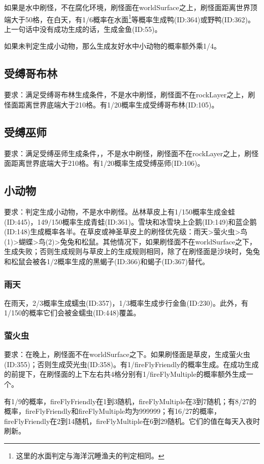 如果是水中刷怪，不在腐化环境，刷怪面在worldSurface之上，刷怪面距离世界顶端大于50格，在白天，有1/6概率在水面\footnote{这里的水面判定与海洋沉睡渔夫的判定相同。}等概率生成鸭(ID:364)或野鸭(ID:362)。上一句话中没有成功生成的话，生成金鱼(ID:55)。

如果未判定生成小动物，那么生成友好水中小动物的概率额外乘1/4。

\subsection{受缚哥布林}
要求：满足受缚哥布林生成条件，不是水中刷怪，刷怪面不在rockLayer之上，刷怪面距离世界底端大于210格。有1/20概率生成受缚哥布林(ID:105)。

\subsection{受缚巫师}
要求：满足受缚巫师生成条件，，不是水中刷怪，刷怪面不在rockLayer之上，刷怪面距离世界底端大于210格。有1/20概率生成受缚巫师(ID:106)。

\subsection{小动物}
要求：判定生成小动物，不是水中刷怪。丛林草皮上有1/150概率生成金蛙(ID:445)，149/150概率生成青蛙(ID:361)。雪块和冰雪块上企鹅(ID:149)和蓝企鹅(ID:148)生成概率各半。在草皮或神圣草皮上的刷怪优先级：雨天>萤火虫>鸟(1)>蝴蝶>鸟(2)>兔兔和松鼠。其他情况下，如果刷怪面不在worldSurface之下，生成失败；否则生成规则与草皮上的生成规则相同，除了在刷怪面是沙块时，兔兔和松鼠会被各1/2概率生成的黑蝎子(ID:366)和蝎子(ID:367)替代。

\subsubsection{雨天}
在雨天，2/3概率生成蠕虫(ID:357)，1/3概率生成步行金鱼(ID:230)。此外，有1/150的概率它们会被金蠕虫(ID:448)覆盖。

\subsubsection{萤火虫}\label{app14}
要求：在晚上，刷怪面不在worldSurface之下。如果刷怪面是草皮，生成萤火虫(ID:355)；否则生成荧光虫(ID:358)。有1/fireFlyFriendly的概率生成。在成功生成的前提下，在刷怪面的上下左右共4格分别有1/fireFlyMultiple的概率额外生成一个。

有1/9的概率，fireFlyFriendly在1到3随机，fireFlyMultiple在3到7随机；有8/27的概率，fireFlyFriendly和fireFlyMultiple均为999999；有16/27的概率，fireFlyFriendly在2到14随机，fireFlyMultiple在6到29随机。它们的值在每天入夜时刷新。

